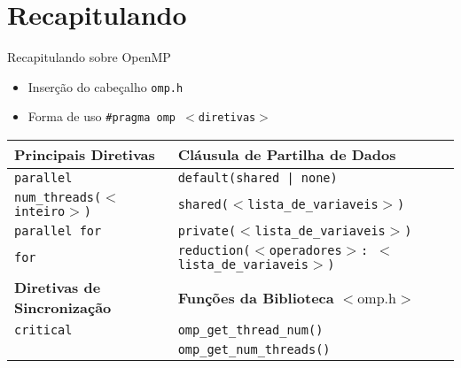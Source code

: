 \section{Recapitulando}
	\begin{frame}[fragile]{Recapitulando sobre OpenMP}
		\begin{itemize}
			\item Inserção do cabeçalho {\tt omp.h}
			\item Forma de uso {\tt \#\quad pragma omp $<$diretivas$>$}
		\end{itemize}
				\pause
		\begin{table}
		    \begin{tabular}{l|l}
		    \hline
		    \textbf{Principais Diretivas}           & \textbf{Cláusula de Partilha de Dados}                             \\ \hline
		    {\tt parallel                } & {\tt default(shared | none)                              } \\
		    {\tt num\_threads($<$inteiro$>$)} & {\tt shared($<$lista\_de\_variaveis$>$)                  } \\
		    {\tt parallel for            } & {\tt private($<$lista\_de\_variaveis$>$)                 } \\
		    {\tt for                     } & {\tt reduction($<$operadores$>$: $<$lista\_de\_variaveis$>$)} \\ \hline \hline

		   \textbf{ Diretivas de Sincronização}     & \textbf{Funções da Biblioteca} $<$omp.h$>$   \\ \hline

			{\tt critical                } & {\tt omp\_get\_thread\_num()      } \\
			{\tt ~                       } & {\tt omp\_get\_num\_threads()     } \\ \hline
		    \end{tabular}
		\end{table}
\end{frame}

